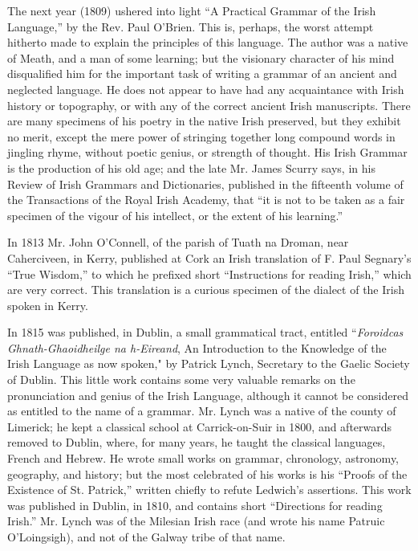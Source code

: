 \documentclass[11pt,oneside]{memoir}
\begin{document}
The next year (1809) ushered into light ``A Practical Grammar of the Irish Language,'' by the Rev. Paul O'Brien.
This is, perhaps, the worst attempt hitherto made to explain the principles of this language.
The author was a native of Meath, and a man of some learning;
but the visionary character of his mind disqualified him for the important task of writing a grammar of an ancient and neglected language.
He does not appear to have had any acquaintance with Irish history or topography, or with any of the correct ancient Irish manuscripts.
There are many specimens of his poetry in the native Irish preserved, but they exhibit no merit, except the mere power of stringing together long compound words in jingling rhyme, without poetic genius, or strength of thought.
His Irish Grammar is the production of his old age; and the late Mr. James Scurry says, in his Review of Irish Grammars and Dictionaries, published in the fifteenth volume of the Transactions of the Royal Irish Academy, that ``it is not to be taken as a fair specimen of the vigour of his intellect, or the extent of his learning.''

In 1813 Mr. John O'Connell, of the parish of Tuath na Droman, near Caherciveen, in Kerry, published at Cork an Irish translation of F. Paul Segnary's ``True Wisdom,'' to which he prefixed short ``Instructions for reading Irish,'' which are very correct.
This translation is a curious specimen of the dialect of the Irish spoken in Kerry.

In 1815 was published, in Dublin, a small grammatical tract, entitled ``\textit{Foroidcas Ghnath-Ghaoidheilge na h-Eireand}, An Introduction to the Knowledge of the Irish Language as now spoken," by Patrick Lynch, Secretary to the Gaelic Society of Dublin.
This little work contains some very valuable remarks on the pronunciation and genius of the Irish Language, although it cannot be considered as entitled to the name of a grammar.
Mr. Lynch was a native of the county of Limerick; he kept a classical school at Carrick-on-Suir in 1800, and afterwards removed to Dublin, where, for many years, he taught the classical languages, French and Hebrew.
He wrote small works on grammar, chronology, astronomy, geography, and history; but the most celebrated of his works is his ``Proofs of the Existence of St. Patrick,'' written chiefly to refute Ledwich's assertions.
This work was published in Dublin, in 1810, and contains short ``Directions for reading Irish.''
Mr. Lynch was of the Milesian Irish race (and wrote his name Patruic O'Loingsigh), and not 
of the Galway tribe of that name.
\end{document}
